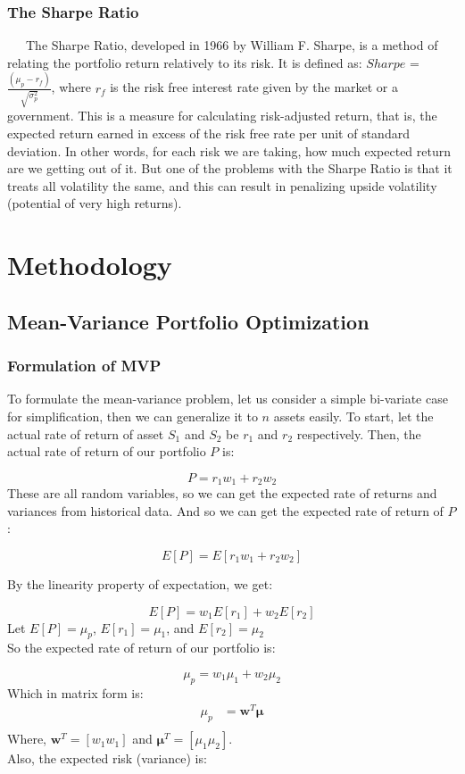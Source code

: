 \documentclass[12pt,titlepage,a4paper]{article}
\begin{document}
\subsubsection{The Sharpe Ratio}
\ \ \  The Sharpe Ratio, developed in 1966 by William F. Sharpe, is a method of relating the portfolio return relatively to its risk. It is defined as: $Sharpe$ = $\frac{(\mu_p - r_f)}{\sqrt{\sigma_p^2}}$, where $r_f$ is the risk free interest rate given by the market or a government.  This is a measure for calculating risk-adjusted return, that is, the expected return earned in excess of the risk free rate per unit of standard deviation. In other words, for each risk we are taking, how much expected return are we getting out of it. But one of the problems with the Sharpe Ratio is that it treats all volatility the same, and this can result in penalizing upside volatility (potential of very high returns).\\

\section{Methodology}
\subsection{Mean-Variance Portfolio Optimization}
\subsubsection{Formulation of MVP}

To formulate the mean-variance problem, let us consider a simple bi-variate case for simplification, then we can generalize it to $n$ assets easily. To start, let the actual rate of return of asset $S_1$ and $S_2$ be $r_1$ and $r_2$ respectively. Then, the actual rate of return of our portfolio $P$ is:

$$
P = r_1w_1 + r_2w_2
$$
These are all random variables, so we can get the expected rate of returns and variances from historical data. And so we can get the expected rate of return of $P$: 

$$
E[P] = E[r_1w_1 + r_2w_2]
$$

By the linearity property of expectation, we get: 

$$
E[P] = w_1E[r_1] + w_2E[r_2]
$$
Let $E[P] = \mu_p$, $E[r_1] = \mu_1$, and $E[r_2]=\mu_2$ \\
So the expected rate of return of our portfolio is: 

$$
\mu_p = w_1 \mu_1 + w_2 \mu_2
$$
Which in matrix form is:
\begin{align*}
	\mu_p &= \mathbf{w}^T\mathbf{\mu} \\
\end{align*}
Where,  $\mathbf{w}^T = [ w_1 w_1 ]$ and  $\mathbf{\mu}^T = [ \mu_1 \mu_2 ]$. 
\\
Also, the expected risk (variance) is: 
\end{document}
